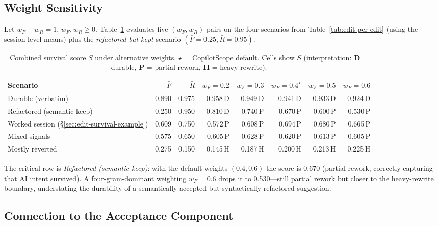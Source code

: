 \documentclass[11pt,a4paper]{article}
\begin{document}
\subsection{Weight Sensitivity}
\label{sec:edit-survival-sensitivity}

Let $w_F + w_R = 1$, $w_F, w_R \geq 0$.  Table~\ref{tab:weight-sensitivity}
evaluates five $(w_F, w_R)$ pairs on the four scenarios from
Table~\ref{tab:edit-per-edit} (using the session-level means) plus the
\emph{refactored-but-kept} scenario $(\bar{F}=0.25,\bar{R}=0.95)$.

\begin{table}[h!]
\centering
\caption{Combined survival score $S$ under alternative weights.
         $\star$ = CopilotScope default.  Cells show $S$ (interpretation:
         \textbf{D} = durable, \textbf{P} = partial rework, \textbf{H} = heavy rewrite).}
\label{tab:weight-sensitivity}
\begin{tabular}{@{}lrrrrrrr@{}}
\toprule
Scenario & $\bar{F}$ & $\bar{R}$ &
  $w_F{=}0.2$ & $w_F{=}0.3$ & $w_F{=}0.4^\star$ &
  $w_F{=}0.5$ & $w_F{=}0.6$ \\
\midrule
Durable (verbatim)
  & 0.890 & 0.975
  & 0.958\,D & 0.949\,D & 0.941\,D & 0.933\,D & 0.924\,D \\
Refactored (semantic keep)
  & 0.250 & 0.950
  & 0.810\,D & 0.740\,P & 0.670\,P & 0.600\,P & 0.530\,P \\
Worked session (§\ref{sec:edit-survival-example})
  & 0.609 & 0.750
  & 0.572\,P & 0.608\,P & 0.694\,P & 0.680\,P & 0.665\,P \\
Mixed signals
  & 0.575 & 0.650
  & 0.605\,P & 0.628\,P & 0.620\,P & 0.613\,P & 0.605\,P \\
Mostly reverted
  & 0.275 & 0.150
  & 0.145\,H & 0.187\,H & 0.200\,H & 0.213\,H & 0.225\,H \\
\bottomrule
\end{tabular}
\end{table}

The critical row is \emph{Refactored (semantic keep)}:
with the default weights $(0.4, 0.6)$ the score is 0.670 (partial rework,
correctly capturing that AI intent survived).  A four-gram-dominant
weighting $w_F{=}0.6$ drops it to 0.530---still partial rework but
closer to the heavy-rewrite boundary, understating the durability of a
semantically accepted but syntactically refactored suggestion.

\subsection{Connection to the Acceptance Component}
\label{sec:edit-survival-acceptance}
\end{document}
